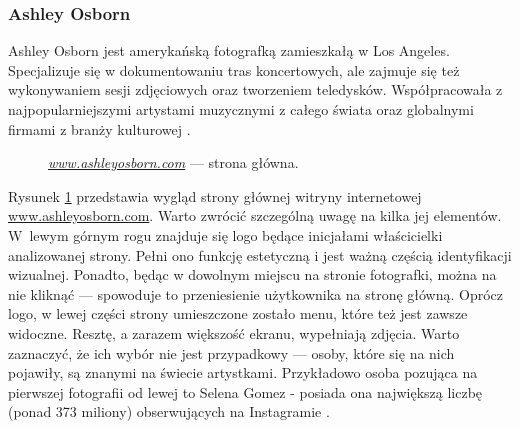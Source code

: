 \documentclass[a4paper, 12pt, twoside]{article}
\numberwithin{figure}{section}
\begin{document}
\begin{sloppypar}

\subsubsection{Ashley Osborn} \label{ashley}

Ashley Osborn jest amerykańską fotografką zamieszkałą w Los Angeles. Specjalizuje się w dokumentowaniu tras koncertowych, ale zajmuje się też wykonywaniem sesji zdjęciowych oraz tworzeniem teledysków. Współpracowała z najpopularniejszymi artystami muzycznymi z całego świata oraz globalnymi firmami z branży kulturowej \cite{ashley}. 

\begin{figure}[H] 
    \centering
   \caption{\textit{\url{www.ashleyosborn.com}} --- strona główna.}
   \label{fig:ashley-1.jpg}
\end{figure}

Rysunek \ref{fig:ashley-1.jpg} przedstawia wygląd strony głównej witryny internetowej \url{www.ashleyosborn.com}. Warto zwrócić szczególną uwagę na kilka jej elementów. W~lewym górnym rogu znajduje się logo będące inicjałami właścicielki analizowanej strony. Pełni ono funkcję estetyczną i jest ważną częścią identyfikacji wizualnej. Ponadto, będąc w dowolnym miejscu na stronie fotografki, można na nie kliknąć --- spowoduje to przeniesienie użytkownika na stronę główną. Oprócz logo, w lewej części strony umieszczone zostało menu, które też jest zawsze widoczne. Resztę, a zarazem większość ekranu, wypełniają zdjęcia. Warto zaznaczyć, że ich wybór nie jest przypadkowy --- osoby, które się na nich pojawiły, są znanymi na świecie artystkami. Przykładowo osoba pozująca na pierwszej fotografii od lewej to Selena Gomez - posiada ona największą liczbę (ponad 373 miliony) obserwujących na Instagramie \cite{instagram}. 


\end{sloppypar}
\end{document}
